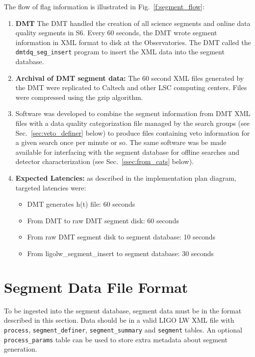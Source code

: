 The flow of flag information is illustrated in
Fig.~\ref{f:segment_flow}:
%
\begin{enumerate}
\item \textbf{DMT} The DMT handled
the creation of all science segments and online data quality segments
in S6. Every 60 seconds, the DMT wrote segment
information in XML format to disk at the Observatories. The DMT called
the \texttt{dmtdq\_seg\_insert} program to insert the XML data into
the segment database.

\item \textbf{Archival of DMT segment data:} The 60 second XML files
generated by the DMT were replicated to Caltech and other LSC
computing centers. Files were compressed using the gzip algorithm.

\item Software was developed to combine the segment
information from DMT XML files with a data quality categorization file
managed by the search groups (see Sec.~\ref{sec:veto_definer}
below) to produce files containing veto information for a given search
once per minute or so.  The same software was be made available for
interfacing with the segment database for offline searches and
detector characterization (see Sec.~\ref{ssec:from_cats}
below).

\item \textbf{Expected Latencies:} as described in the implementation plan
diagram, targeted latencies were:
\begin{itemize}
\item DMT generates h(t) file: 60 seconds
\item From DMT to raw DMT segment disk: 60 seconds
\item From raw DMT segment disk to segment database: 10 seconds
\item From ligolw\_segment\_insert to segment database: 30 seconds
\end{itemize}
\end{enumerate}



\section{Segment Data File Format}
\label{sec:data_file_format}

To be ingested into the segment database, segment data must be in the
format described in this section. Data should be in a valid LIGO LW
XML file with \verb|process|, \verb|segment_definer|,
\verb|segment_summary| and \verb|segment| tables. An optional
\verb|process_params| table can be used to store extra metadata about
segment generation.

